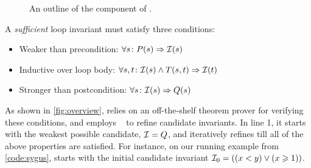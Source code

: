 \documentclass[conference]{IEEEtran}
\begin{document}
\begin{figure}[!t]
    \caption{An outline of the \Infer component of \LoopInvGen.}
    \label{algo:infer}
\end{figure}


A \emph{sufficient} loop invariant \Inv must satisfy three conditions:
\begin{itemize}[leftmargin=1.25em]
    \item Weaker than precondition: \hspace*{4.75pt} $\forall s\colon P(s) \Rightarrow \mathcal{I}(s)$
    \item Inductive over loop body: \hspace*{6.5pt} $\forall s,t\colon \mathcal{I}(s) \wedge T(s,t) \Rightarrow \mathcal{I}(t)$
    \item Stronger than postcondition: $\forall s\colon \mathcal{I}(s) \Rightarrow Q(s)$
\end{itemize}
As shown in \cref{fig:overview}, \Infer relies on an off-the-shelf theorem prover \Checker for verifying these conditions,
and employs \PIE~\citep{Padhi2016DatadrivenPI} to refine candidate invariants.
In line 1, it starts with the weakest possible candidate,
$\mathcal{I} = Q$, and iteratively refines \Inv till all of the above properties are satisfied.
For instance, on our running example from \cref{code:sygus},
\Infer starts with the initial candidate invariant $\mathcal{I}_0 = ((x < y) \vee (x \geqslant 1))$.
\end{document}
